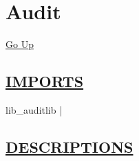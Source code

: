 \chapter*{\color{headfile}
Audit
}
\hypertarget{ecldoc:toc:Audit}{}
\hyperlink{ecldoc:toc:root}{Go Up}

\section*{\underline{\textsf{IMPORTS}}}
\begin{doublespace}
{\large
lib\_auditlib |
}
\end{doublespace}

\section*{\underline{\textsf{DESCRIPTIONS}}}
